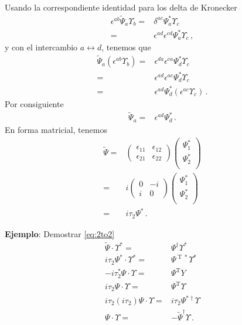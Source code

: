 \begin{frame}
Usando la correspondiente identidad para los delta de Kronecker
\begin{align}
   \epsilon^{ab}\widetilde{\Psi}_{a} \Upsilon_{b} =&\delta^{ac}\Psi_a^{*}\Upsilon_c \nonumber\\
                                     =&\epsilon^{ad}\epsilon^{cd}\Psi_a^{*}\Upsilon_c \,,
 \end{align}
y con el intercambio $a\leftrightarrow d$, tenemos que
\begin{align}
  \widetilde{\Psi}_{a} \left( \epsilon^{ab}\Upsilon_{b}\right)=&\epsilon^{da}\epsilon^{ca}\Psi_d^{*}\Upsilon_c \nonumber\\
=&\epsilon^{ad}\epsilon^{ac}\Psi_d^{*}\Upsilon_c \nonumber\\
=&\epsilon^{ad}\Psi_d^{*}\left( \epsilon^{ac}\Upsilon_c \right)\,.
\end{align}
Por consiguiente
\begin{align}
\widetilde{\Psi}_a=& \epsilon^{ad}\Psi_d^{*} \,.
\end{align}
En forma matricial, tenemos
\begin{align}
     \widetilde{\Psi}=&\begin{pmatrix} 
                  \epsilon_{11} & \epsilon_{12}\\
                 \epsilon_{21} & \epsilon_{22}
               \end{pmatrix}
               \begin{pmatrix}
                 \Psi_1^{*}\\
                 \Psi_2^{*}\\
               \end{pmatrix}\nonumber\\
               =&i\begin{pmatrix}
                 0 & -i\\
                 i & 0
               \end{pmatrix}
               \begin{pmatrix}
                 \Psi_1^{*}\\
                 \Psi_2^{*}\\
               \end{pmatrix}\nonumber\\
             =&i \tau_2 \Psi^{*}\,.
\end{align}

\textbf{Ejemplo}: Demostrar \eqref{eq:2to2}
\begin{align}
  \widetilde{\Psi}\cdot \Upsilon^*=& \Psi^{\dagger} \Upsilon^* \nonumber\\
  i \tau_2 \Psi^*\cdot \Upsilon^* =&\Psi^{\operatorname{T}*}  \Upsilon^* \nonumber\\
  -i \tau_2^* \Psi \cdot \Upsilon= & \Psi^{\operatorname{T}} Y \nonumber\\
  i \tau_2 \Psi \cdot \Upsilon=&  \Psi^{\operatorname{T}}  \Upsilon \nonumber\\
  i \tau_2( i \tau_2) \Psi \cdot \Upsilon=& i \tau_2 \Psi^{*\dagger}  \Upsilon \nonumber\\
   \Psi \cdot \Upsilon=& - \widetilde{\Psi}^{\dagger}  \Upsilon \,.
\end{align}



\end{frame}
